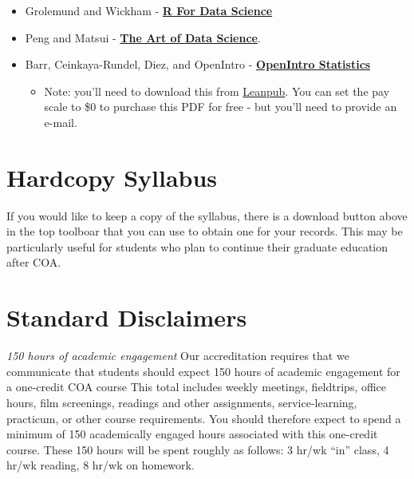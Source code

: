 \documentclass[
]{book}
\providecommand{\tightlist}{%
  \setlength{\itemsep}{0pt}\setlength{\parskip}{0pt}}
\begin{document}
\begin{itemize}
\tightlist
\item
  Grolemund and Wickham - \textbf{\href{https://r4ds.had.co.nz/}{R For Data Science}}
\item
  Peng and Matsui - \textbf{\href{https://bookdown.org/rdpeng/artofdatascience/epicycles-of-analysis.html}{The Art of Data Science}}.
\item
  Barr, Ceinkaya-Rundel, Diez, and OpenIntro - \textbf{\href{https://www.openintro.org/book/os/}{OpenIntro Statistics}}

  \begin{itemize}
  \tightlist
  \item
    Note: you'll need to download this from \href{https://leanpub.com/os}{Leanpub}. You can set the pay scale to \$0 to purchase this PDF for free - but you'll need to provide an e-mail.
  \end{itemize}
\end{itemize}

\hypertarget{hardcopy-syllabus}{%
\section*{Hardcopy Syllabus}\label{hardcopy-syllabus}}

If you would like to keep a copy of the syllabus, there is a download button above in the top toolboar that you can use to obtain one for your records. This may be particularly useful for students who plan to continue their graduate education after COA.

\hypertarget{standard-disclaimers}{%
\section*{Standard Disclaimers}\label{standard-disclaimers}}

\emph{150 hours of academic engagement}
Our accreditation requires that we communicate that students should expect 150 hours of academic engagement for a one-credit COA course This total includes weekly meetings, fieldtrips, office hours, film screenings, readings and other assignments, service-learning, practicum, or other course requirements. You should therefore expect to spend a minimum of 150 academically engaged hours associated with this one-credit course. These 150 hours will be spent roughly as follows: 3 hr/wk ``in'' class, 4 hr/wk reading, 8 hr/wk on homework.
\end{document}

